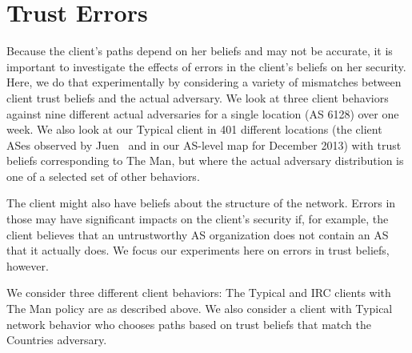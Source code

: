 \documentclass[conference]{styles/IEEEtran}
\begin{document}
\section{Trust Errors}\label{sec:errors}



























Because the client's paths depend on her beliefs and may not be accurate, it is important to investigate the effects of errors in the client's beliefs on her security.  Here, we do that experimentally by considering a variety of mismatches between client trust beliefs and the actual adversary.  We look at three client behaviors against nine different actual adversaries for a single location (AS 6128) over one week.  We also look at our Typical client in 401 different locations (the client ASes observed by Juen~\cite{juen-masters} and in our AS-level map for December 2013) with trust beliefs corresponding to \textsf{The Man}, but where the actual adversary distribution is one of a selected set of other behaviors.  

The client might also have beliefs about the structure of the network.  Errors in those may have significant impacts on the client's security if, for example, the client believes that an untrustworthy AS organization does not contain an AS that it actually does. We focus our experiments here on errors in trust beliefs, however. 

We consider three different client behaviors:  The Typical and IRC clients with \textsf{The Man}
policy are as described above.  We also consider a client with Typical network behavior who chooses
paths based on trust beliefs that match the \textsf{Countries} adversary.  
\end{document}
